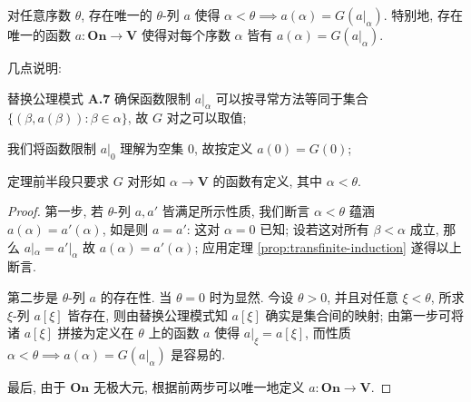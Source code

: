 \begin{theorem}[超穷递归原理]
	对任意序数 $\theta$, 存在唯一的 $\theta$-列 $a$ 使得 $\alpha < \theta \implies a(\alpha) = G(a|_\alpha)$. 特别地, 存在唯一的函数 $a: \textbf{On} \to \textbf{V}$ 使得对每个序数 $\alpha$ 皆有 $a(\alpha) = G(a|_\alpha)$.
\end{theorem}
几点说明:
\begin{inparaenum}[(a)]
	\item 替换公理模式 \textbf{A.7} 确保函数限制 $a|_\alpha$ 可以按寻常方法等同于集合 $\{ (\beta, a(\beta)) : \beta \in \alpha \}$, 故 $G$ 对之可以取值;
	\item 我们将函数限制 $a|_0$ 理解为空集 $0$, 故按定义 $a(0) = G(0)$;
	\item 定理前半段只要求 $G$ 对形如 $\alpha \to \textbf{V}$ 的函数有定义, 其中 $\alpha < \theta$.
\end{inparaenum}
\begin{proof}
	第一步, 若 $\theta$-列 $a, a'$ 皆满足所示性质, 我们断言 $\alpha < \theta$ 蕴涵 $a(\alpha) = a'(\alpha)$, 如是则 $a=a'$: 这对 $\alpha=0$ 已知; 设若这对所有 $\beta < \alpha$ 成立, 那么 $a|_\alpha = a'|_\alpha$ 故 $a(\alpha) = a'(\alpha)$; 应用定理 \ref{prop:transfinite-induction} 遂得以上断言.
	
	第二步是 $\theta$-列 $a$ 的存在性. 当 $\theta=0$ 时为显然. 今设 $\theta > 0$, 并且对任意 $\xi < \theta$, 所求 $\xi$-列 $a[\xi]$ 皆存在, 则由替换公理模式知 $a[\xi]$ 确实是集合间的映射; 由第一步可将诸 $a[\xi]$ 拼接为定义在 $\theta$ 上的函数 $a$ 使得 $a|_\xi = a[\xi]$, 而性质 $\alpha < \theta \implies a(\alpha) = G(a|_\alpha)$ 是容易的.
	
	最后, 由于 $\textbf{On}$ 无极大元, 根据前两步可以唯一地定义 $a: \textbf{On} \to \textbf{V}$.
\end{proof}

